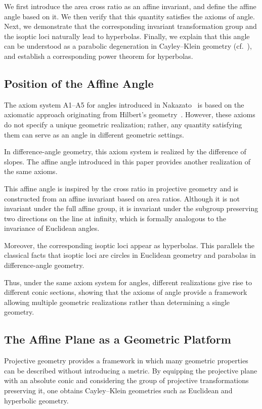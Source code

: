\documentclass[12pt]{article}
\begin{document}
We first introduce the area cross ratio as an affine invariant,
and define the affine angle based on it.
We then verify that this quantity satisfies the axioms of angle.
Next, we demonstrate that the corresponding invariant transformation group
and the isoptic loci naturally lead to hyperbolas.
Finally, we explain that this angle can be understood
as a parabolic degeneration in Cayley--Klein geometry
(cf.~\cite{Klein1871, Klein1873}),
and establish a corresponding power theorem for hyperbolas.


\subsection{Position of the Affine Angle}

The axiom system A1--A5 for angles introduced in Nakazato~\cite{Nakazato2025Base1}
is based on the axiomatic approach originating from Hilbert's geometry~\cite{Hilbert1899}.
However, these axioms do not specify a unique geometric realization;
rather, any quantity satisfying them can serve as an angle
in different geometric settings.

In difference-angle geometry, this axiom system is realized
by the difference of slopes.
The affine angle introduced in this paper provides another realization
of the same axioms.

This affine angle is inspired by the cross ratio in projective geometry
and is constructed from an affine invariant based on area ratios.
Although it is not invariant under the full affine group,
it is invariant under the subgroup preserving two directions
on the line at infinity,
which is formally analogous to the invariance of Euclidean angles.

Moreover, the corresponding isoptic loci appear as hyperbolas.
This parallels the classical facts that isoptic loci are circles
in Euclidean geometry and parabolas in difference-angle geometry.

Thus, under the same axiom system for angles,
different realizations give rise to different conic sections,
showing that the axioms of angle provide a framework
allowing multiple geometric realizations rather than determining a single geometry.

\subsection{The Affine Plane as a Geometric Platform}

Projective geometry provides a framework in which many geometric properties
can be described without introducing a metric.
By equipping the projective plane with an absolute conic
and considering the group of projective transformations preserving it,
one obtains Cayley--Klein geometries such as Euclidean and hyperbolic geometry.
\end{document}

